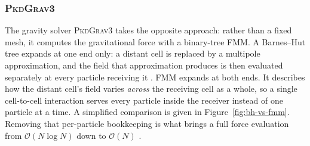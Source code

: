 \documentclass{report}
\begin{document}
\subsubsection{\textsc{PkdGrav3}}
\label{sec:pkdgrav}

The gravity solver \textsc{PkdGrav3} takes the opposite approach: rather than a fixed mesh, it computes the gravitational force with a binary-tree FMM. A Barnes--Hut tree expands at one end only: a distant cell is replaced by a multipole approximation, and the field that approximation produces is then evaluated separately at every particle receiving it \cite{barnes_hierarchical_1986}. FMM expands at both ends. It describes how the distant cell's field varies \emph{across} the receiving cell as a whole, so a single cell-to-cell interaction serves every particle inside the receiver instead of one particle at a time. A simplified comparison is given in Figure~\ref{fig:bh-vs-fmm}. Removing that per-particle bookkeeping is what brings a full force evaluation from \mbox{$\mathcal{O}(N\log N)$} down to \mbox{$\mathcal{O}(N)$} \cite{potter_pkdgrav3_2016}.
\end{document}

